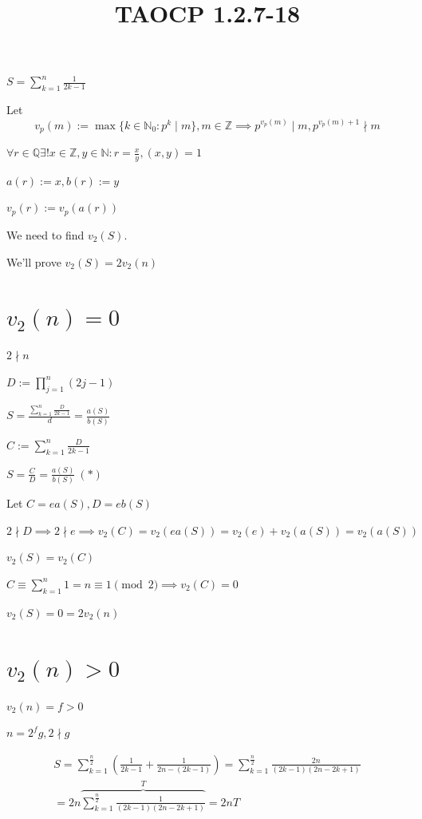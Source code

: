 \documentclass{article}
\title{TAOCP 1.2.7\mbox{-}18}
\begin{document}
\maketitle

\( S = \sum_{k=1}^{n} \frac{1}{2k-1} \)

Let
\[ v_{p}(m) := \max \{ k \in \mathbb{N}_{0}: p^{k} \mid m \}, m \in \mathbb{Z} \implies p^{v_{p}(m)} \mid m, p^{v_{p}(m) + 1} \nmid m \]

\( \forall r\in\mathbb{Q} \exists! x\in\mathbb{Z}, y\in\mathbb{N}: r = \frac{x}{y}, (x,y)=1 \)

\( a(r) := x, b(r) := y \)

\( v_{p}(r) := v_{p}(a(r)) \)

We need to find \( v_{2}(S) \).

We'll prove \( v_{2}(S) = 2 v_{2}(n) \)

\section*{\( v_{2}(n) = 0 \)}

\( 2 \nmid n \)

\( D := \prod_{j=1}^{n} (2j-1) \)

\( S = \frac{\sum_{k=1}^{n} \frac{D}{2k-1}}{d} = \frac{a(S)}{b(S)} \)

\( C := \sum_{k=1}^{n} \frac{D}{2k-1} \)

\( S = \frac{C}{D} = \frac{a(S)}{b(S)}\ (*) \)

Let \( C = ea(S), D = eb(S) \)

\( 2 \nmid D \implies 2 \nmid e \implies v_{2}(C) = v_{2}(ea(S)) = v_{2}(e) + v_{2}(a(S)) = v_{2}(a(S)) \)

\( v_{2}(S) = v_{2}(C) \)

\( C \equiv \sum_{k=1}^{n} 1 = n \equiv 1 \pmod 2 \implies v_{2}(C) = 0 \)

\( v_{2}(S) = 0 = 2 v_{2}(n) \)

\section*{\( v_{2}(n) > 0 \)}

\( v_{2}(n) = f > 0 \)

\( n = 2^{f} g, 2 \nmid g \)

\begin{multline*}
S = \sum_{k=1}^{\frac{n}{2}}(\frac{1}{2k-1} + \frac{1}{2n-(2k-1)}) = \sum_{k=1}^{\frac{n}{2}}\frac{2n}{(2k-1)(2n-2k+1)} \\
= 2n \overbrace{\sum_{k=1}^{\frac{n}{2}}\frac{1}{(2k-1)(2n-2k+1)}}^{T} = 2nT
\end{multline*}
\end{document}
